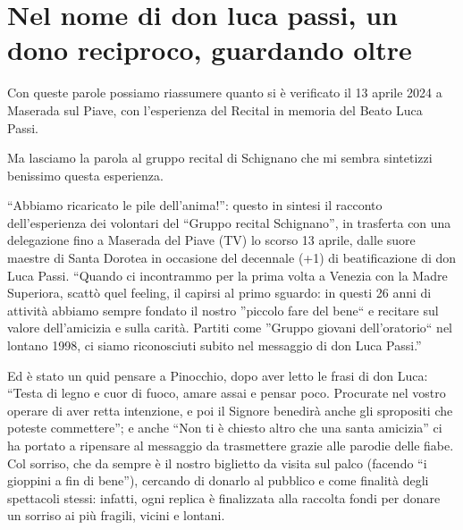 \section{Nel nome di don luca passi, un dono reciproco, guardando oltre}

Con queste parole possiamo riassumere quanto si è verificato il 13 aprile 2024 a Maserada sul Piave, con l’esperienza del Recital in memoria del Beato Luca Passi.

Ma lasciamo la parola al gruppo recital di Schignano che mi sembra sintetizzi benissimo questa esperienza.



\begin{citazione}
``Abbiamo ricaricato le pile dell’anima!'': questo in sintesi il racconto dell’esperienza dei volontari del “Gruppo recital Schignano”, in trasferta con una delegazione fino a Maserada del Piave (TV) lo scorso 13 aprile, dalle suore maestre di Santa Dorotea in occasione del decennale (+1) di beatificazione di don Luca Passi. ``Quando ci incontrammo per la prima volta a Venezia con la Madre Superiora, scattò quel feeling, il capirsi al primo sguardo: in questi 26 anni di attività abbiamo sempre fondato il nostro ''piccolo fare del bene`` e recitare sul valore dell’amicizia e sulla carità. Partiti come ''Gruppo giovani dell’oratorio`` nel lontano 1998, ci siamo riconosciuti subito nel messaggio di don Luca Passi.''

Ed è stato un quid pensare a Pinocchio, dopo aver letto le frasi di don Luca: ``Testa di legno e cuor di fuoco, amare assai e pensar poco. Procurate nel vostro operare di aver retta intenzione, e poi il Signore benedirà anche gli spropositi che poteste commettere''; e anche ``Non ti è chiesto altro che una santa amicizia'' ci ha portato a ripensare al messaggio da trasmettere grazie alle parodie delle fiabe. Col sorriso, che da sempre è il nostro biglietto da visita sul palco (facendo ``i gioppini a fin di bene''), cercando di donarlo al pubblico e come finalità degli spettacoli stessi: infatti, ogni replica è finalizzata alla raccolta fondi per donare un sorriso ai più fragili, vicini e lontani.



\end{citazione}
